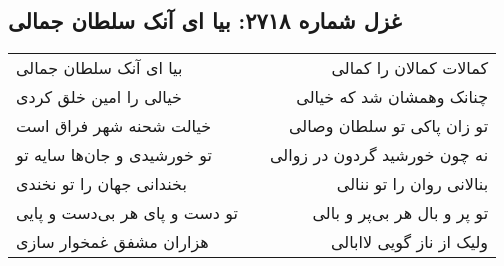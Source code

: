 \begin{center}
\section*{غزل شماره ۲۷۱۸: بیا ای آنک سلطان جمالی}
\label{sec:2718}
\begin{longtable}{l p{0.5cm} r}
بیا ای آنک سلطان جمالی
&&
کمالات کمالان را کمالی
\\
خیالی را امین خلق کردی
&&
چنانک وهمشان شد که خیالی
\\
خیالت شحنه شهر فراق است
&&
تو زان پاکی تو سلطان وصالی
\\
تو خورشیدی و جان‌ها سایه تو
&&
نه چون خورشید گردون در زوالی
\\
بخندانی جهان را تو نخندی
&&
بنالانی روان را تو ننالی
\\
تو دست و پای هر بی‌دست و پایی
&&
تو پر و بال هر بی‌پر و بالی
\\
هزاران مشفق غمخوار سازی
&&
ولیک از ناز گویی لاابالی
\\
\end{longtable}
\end{center}
